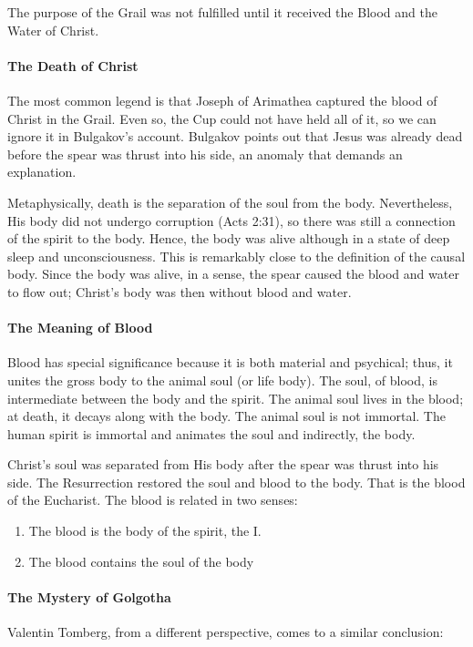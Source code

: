 The purpose of the Grail was not fulfilled until it received the Blood and the Water of Christ.

\paragraph{The Death of Christ}
The most common legend is that Joseph of Arimathea captured the blood of Christ in the Grail. Even so, the Cup could not have held all of it, so we can ignore it in Bulgakov's account. Bulgakov points out that Jesus was already dead before the spear was thrust into his side, an anomaly that demands an explanation.

Metaphysically, death is the separation of the soul from the body. Nevertheless, His body did not undergo corruption (Acts 2:31), so there was still a connection of the spirit to the body. Hence, the body was alive although in a state of deep sleep and unconsciousness. This is remarkably close to the definition of the causal body. Since the body was alive, in a sense, the spear caused the blood and water to flow out; Christ's body was then without blood and water.

\paragraph{The Meaning of Blood}
Blood has special significance because it is both material and psychical; thus, it unites the gross body to the animal soul (or life body). The soul, of blood, is intermediate between the body and the spirit. The animal soul lives in the blood; at death, it decays along with the body. The animal soul is not immortal. The human spirit is immortal and animates the soul and indirectly, the body.

Christ's soul was separated from His body after the spear was thrust into his side. The Resurrection restored the soul and blood to the body. That is the blood of the Eucharist. The blood is related in two senses:

\begin{enumerate}
\item The blood is the body of the spirit, the I. 
\item The blood contains the soul of the body 
\end{enumerate}
\paragraph{The Mystery of Golgotha}
Valentin Tomberg, from a different perspective, comes to a similar conclusion:

